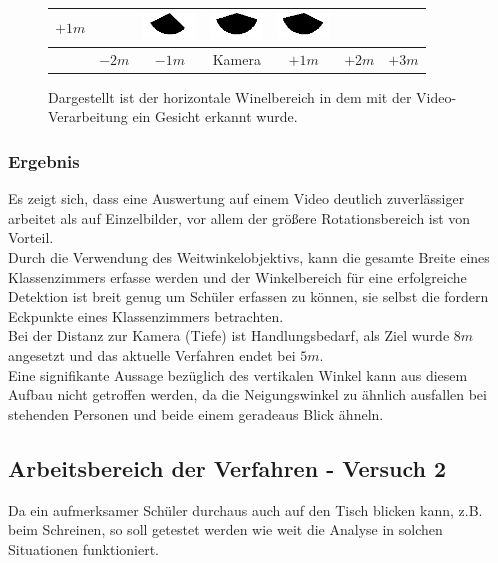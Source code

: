\begin{figure}
\begin{tabular}{|c|c|c|c|c|c|c|}
		\hline 
		$+1m$ & &
		\includegraphics[width=1.4cm]{PosWinkelVideo/Winkel_V_100_100.png}&
		\includegraphics[width=1.4cm]{PosWinkelVideo/Winkel_V_0_100.png}&
		\includegraphics[width=1.4cm]{PosWinkelVideo/Winkel_V_-100_100.png}& &\\ 
		\hline 
		& $-2m$ & $-1m$ &Kamera& $+1m$ & $+2m$ & $+3m$ \\ 
		\hline 
	\end{tabular}
	\caption{Dargestellt ist der horizontale Winelbereich in dem mit der Video-Verarbeitung ein Gesicht erkannt wurde.}
	\label{graph_Test_Video}
\end{figure}
\subsubsection{Ergebnis}
Es zeigt sich, dass eine Auswertung auf einem Video deutlich zuverlässiger arbeitet als auf Einzelbilder, vor allem der größere Rotationsbereich ist von Vorteil.\\
Durch die Verwendung des Weitwinkelobjektivs, kann die gesamte Breite eines Klassenzimmers erfasse werden und der Winkelbereich für eine erfolgreiche Detektion ist breit genug um Schüler erfassen zu können, sie selbst die fordern Eckpunkte eines Klassenzimmers betrachten.\\
Bei der Distanz zur Kamera (Tiefe) ist Handlungsbedarf, als Ziel wurde $8m$ angesetzt und das aktuelle Verfahren endet bei $5m$.\\
Eine signifikante Aussage bezüglich des vertikalen Winkel kann aus diesem Aufbau nicht getroffen werden, da die Neigungswinkel zu ähnlich ausfallen bei stehenden Personen und beide einem geradeaus Blick ähneln.
\subsection{Arbeitsbereich der Verfahren - Versuch 2}
Da ein aufmerksamer Schüler durchaus auch auf den Tisch blicken kann, z.B. beim Schreinen, so soll getestet werden wie weit die Analyse in solchen Situationen funktioniert.
